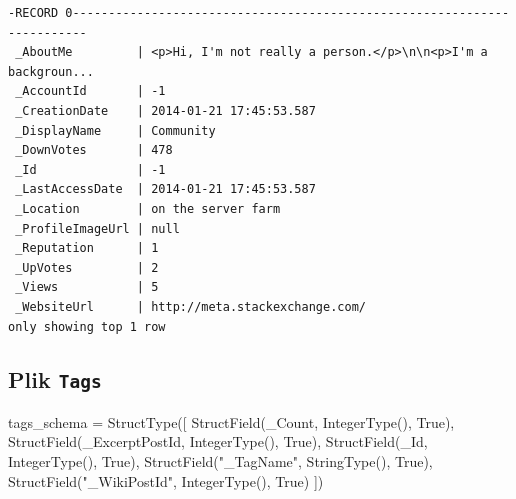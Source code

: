\documentclass[
  letterpaper,
  DIV=11,
  numbers=noendperiod]{scrreprt}
\newenvironment{Shaded}{\begin{snugshade}}{\end{snugshade}}
\newcommand{\NormalTok}[1]{\textcolor[rgb]{0.00,0.23,0.31}{#1}}
\newcommand{\OperatorTok}[1]{\textcolor[rgb]{0.37,0.37,0.37}{#1}}
\newcommand{\StringTok}[1]{\textcolor[rgb]{0.13,0.47,0.30}{#1}}
\newcommand{\VariableTok}[1]{\textcolor[rgb]{0.07,0.07,0.07}{#1}}
\begin{document}
\begin{verbatim}
-RECORD 0------------------------------------------------------------------------
 _AboutMe         | <p>Hi, I'm not really a person.</p>\n\n<p>I'm a backgroun... 
 _AccountId       | -1                                                           
 _CreationDate    | 2014-01-21 17:45:53.587                                      
 _DisplayName     | Community                                                    
 _DownVotes       | 478                                                          
 _Id              | -1                                                           
 _LastAccessDate  | 2014-01-21 17:45:53.587                                      
 _Location        | on the server farm                                           
 _ProfileImageUrl | null                                                         
 _Reputation      | 1                                                            
 _UpVotes         | 2                                                            
 _Views           | 5                                                            
 _WebsiteUrl      | http://meta.stackexchange.com/                               
only showing top 1 row
\end{verbatim}

\hypertarget{plik-tags}{%
\subsection{\texorpdfstring{Plik
\texttt{Tags}}{Plik Tags}}\label{plik-tags}}

\small

\begin{Shaded}
\begin{Highlighting}[]
\NormalTok{tags\_schema }\OperatorTok{=}\NormalTok{ StructType([}
\NormalTok{    StructField(}\StringTok{\textquotesingle{}\_Count\textquotesingle{}}\NormalTok{, IntegerType(), }\VariableTok{True}\NormalTok{),}
\NormalTok{    StructField(}\StringTok{\textquotesingle{}\_ExcerptPostId\textquotesingle{}}\NormalTok{, IntegerType(), }\VariableTok{True}\NormalTok{),}
\NormalTok{    StructField(}\StringTok{\textquotesingle{}\_Id\textquotesingle{}}\NormalTok{, IntegerType(), }\VariableTok{True}\NormalTok{),}
\NormalTok{    StructField(}\StringTok{"\_TagName"}\NormalTok{, StringType(), }\VariableTok{True}\NormalTok{),}
\NormalTok{    StructField(}\StringTok{"\_WikiPostId"}\NormalTok{, IntegerType(), }\VariableTok{True}\NormalTok{)}
\NormalTok{])}
\end{Highlighting}
\end{Shaded}
\end{document}

